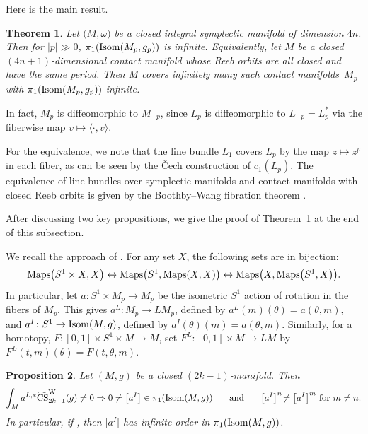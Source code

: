 \documentclass[10pt,a4paper]{amsart}
\numberwithin{equation}{section}
\newtheorem{Theorem}{Theorem}[section]
\newtheorem{Proposition}[Theorem]{Proposition}
\theoremstyle{definition}
\newcommand{\maps}{{\rm Maps} }
\newcommand{\bm}{ M}
\newcommand{\ocs}{\widetilde{{\rm CS}}}
\newcommand{\om}{\overline{M}}
\newcommand{\omp}{M_p}
\newcommand{\isom}{{\rm Isom}}
\newcommand{\ism}{\isom}
\begin{document}
 Here is the main result.


\begin{Theorem} \label{thm:main} Let $\bigl(\om,\omega\bigr)$ be a closed integral symplectic manifold of dimension $4n$.
Then for $|p| \gg 0 $,
 $\pi_1({\rm Isom}(\omp,g_p))$ is infinite. Equivalently, let $M$ be a closed $(4n+1)$-dimensional contact manifold whose Reeb orbits are all closed and have the same period. Then $M$ covers infinitely many such contact manifolds~$\omp$ with
$\pi_1({\rm Isom}(\omp,g_p))$ infinite.
\end{Theorem}

In fact, $\omp$ is diffeomorphic to $M_{-p}$, since $L_p$ is diffeomorphic to $L_{-p} = L_p^*$
via the fiberwise map $v\mapsto \langle \cdot, v\rangle$.

 For the equivalence, we note that the line bundle $L_1$ covers $L_p$ by the map $z\mapsto z^p$ in each fiber, as can be seen by the \v{C}ech construction of $c_1(L_p)$. The equivalence of line bundles over symplectic manifolds and contact manifolds with closed Reeb orbits is given by the Boothby--Wang fibration theorem
\cite[Theorem~3.9]{Blair}.

After discussing two key propositions, we give the proof of Theorem~\ref{thm:main} at the end of this subsection.

We recall the approach of \cite{MRT4}. For any set $X$, the following sets are in bijection:
\[
\maps\bigl(S^1\times X,X\bigr)\leftrightarrow \maps\bigl(S^1, \maps(X,X)\bigr)\leftrightarrow \maps\bigl(X, \maps\bigl(S^1,X\bigr)\bigr).
\]
In particular, let $a\colon S^1\times \omp\to\omp$ be the isometric $S^1$ action of rotation in the fibers of $\omp$. This gives
$a^L\colon \omp\to L\omp$, defined by $a^L(m)(\theta) = a(\theta,m)$, and
$a^I\colon S^1\to\ism(M,g)$, defined by $a^I(\theta)(m) = a(\theta,m)$.
Similarly, for a homotopy,
$F\colon [0,1]\times S^1\times \bm\to \bm$, set
$F^L\colon [0,1]\times \bm\to L\bm$ by $ F^L(t,m)(\theta) = F(t,\theta, m)$.



\begin{Proposition}\label{customprop:app} Let $(\bm,g)$ be a closed $(2k-1)$-manifold. Then
\begin{gather*}
\int_{\bm} a^{L,*}\ocs^{\rm W}_{2k-1}(g) \neq 0 \Rightarrow 0\neq \bigl[a^I\bigr]\in \pi_1(\isom(\bm,g))
\qquad\! {\rm and}\qquad\! \bigl[a^I\bigr]^n\! \neq \bigl[a^I\bigr]^m\ {\rm for} \ m\neq n.
\end{gather*}
In particular, if \smash{$\int_{\bm} a^{L,*}\ocs{}^{\rm W}_{2k-1}(g) \neq 0$}, then $\bigl[a^I\bigr]$ has infinite order in $\pi_1(\ism(M,g))$.
\end{Proposition}
\end{document}
